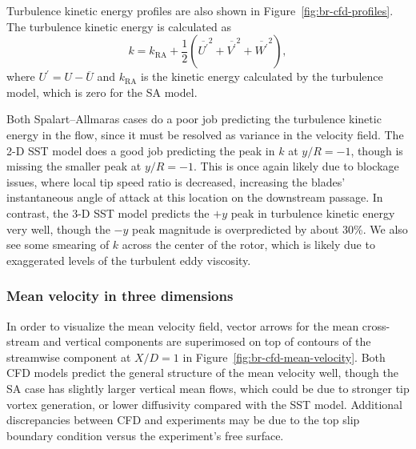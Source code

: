 \documentclass[aip,graphicx]{revtex4-1}
\begin{document}
Turbulence kinetic energy profiles are also shown in
Figure~\ref{fig:br-cfd-profiles}. The turbulence kinetic energy is calculated as
\begin{equation}
k = k_{\mathrm{RA}} + \frac{1}{2} \left(
\overline{U^\prime}^2 +
\overline{V^\prime}^2 +
\overline{W^\prime}^2 \right),
\label{eq:k}
\end{equation}
where $U^\prime = U - \overline{U}$ and $k_{\mathrm{RA}}$ is the kinetic energy
calculated by the turbulence model, which is zero for the SA model.

Both Spalart--Allmaras cases do a poor job predicting the turbulence kinetic
energy in the flow, since it must be resolved as variance in the velocity field.
The 2-D SST model does a good job predicting the peak in $k$ at $y/R=-1$, though
is missing the smaller peak at $y/R=-1$. This is once again likely due to
blockage issues, where local tip speed ratio is decreased, increasing the
blades' instantaneous angle of attack at this location on the downstream
passage. In contrast, the 3-D SST model predicts the $+y$ peak in turbulence
kinetic energy very well, though the $-y$ peak magnitude is overpredicted by
about 30\%. We also see some smearing of $k$ across the center of the rotor,
which is likely due to exaggerated levels of the turbulent eddy viscosity.


\subsubsection{Mean velocity in three dimensions}

In order to visualize the mean velocity field, vector arrows for the mean
cross-stream and vertical components are superimosed on top of contours of the
streamwise component at $X/D=1$ in Figure~\ref{fig:br-cfd-mean-velocity}. Both
CFD models predict the general structure of the mean velocity well, though the
SA case has slightly larger vertical mean flows, which could be due to stronger
tip vortex generation, or lower diffusivity compared with the SST model.
Additional discrepancies between CFD and experiments may be due to the top slip
boundary condition versus the experiment's free surface.
\end{document}
